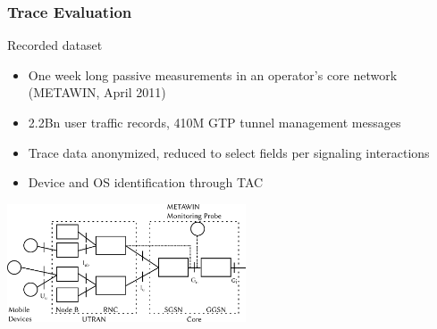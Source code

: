 \documentclass{beamer}
\def\Put(#1,#2)#3{\leavevmode\makebox(0,0){\put(#1,#2){#3}}}
\begin{document}
\begin{frame}
	\frametitle{Trace Evaluation}
	\begin{block}{Recorded dataset}
	\begin{itemize}
		\item One week long passive measurements in an operator's core network (METAWIN, April 2011)
		\item 2.2Bn user traffic records, 410M GTP tunnel management messages
		\item Trace data anonymized, reduced to select fields per signaling interactions
		\item Device and OS identification through TAC
	\end{itemize}
	\end{block}
	\begin{center}
		\includegraphics[height=3.5cm]{../../chapters/04-mobilenets/images/umts-network.pdf}
	\end{center}
	\vspace{3em}
\end{frame}
\end{document}
